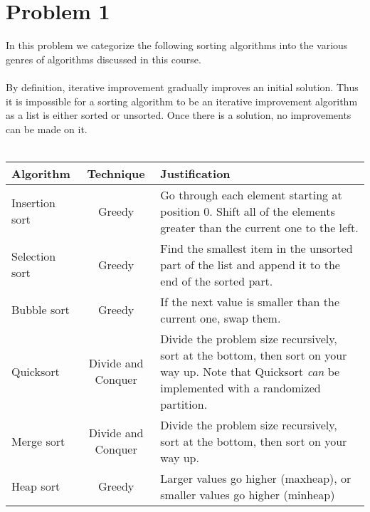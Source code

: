 \section*{Problem 1}

In this problem we categorize the following sorting algorithms into the
various genres of algorithms discussed in this course.
\\
\\
By definition, iterative improvement gradually improves an initial solution.
Thus it is impossible for a sorting algorithm to be an iterative improvement 
algorithm as a list is either sorted or unsorted. Once there is a solution,  no
improvements can be made on it.
\\
\\
\begin{tabular}{l c p{6cm}}
        \textbf{Algorithm} & \textbf{Technique} & \textbf{Justification} \\
        \hline
    Insertion sort & Greedy & Go through each element starting at position 0. Shift all of the elements greater than the current one to the left.\\
    Selection sort & Greedy & Find the smallest item in the unsorted part of the list and append it to the end of the sorted part. \\
    Bubble sort & Greedy & If the next value is smaller than the current one, swap them.\\
    Quicksort & Divide and Conquer & Divide the problem size recursively, sort at the bottom, then sort on your way up. Note that Quicksort \textit{can} be implemented with a randomized partition.\\
    Merge sort & Divide and Conquer & Divide the problem size recursively, sort at the bottom, then sort on your way up.\\
    Heap sort & Greedy & Larger values go higher (maxheap), or smaller values go higher (minheap)\\
\end{tabular}
